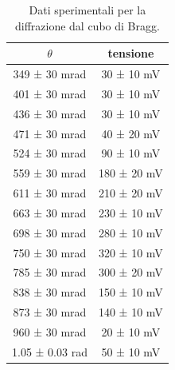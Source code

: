 \documentclass[a4paper]{article}
\begin{document}
\begin{table}[htbp]
\centering
\begin{tabular}{|c|c|}
\hline
$\theta$ & tensione \\\hline\hline
349 ± 30 mrad & 30 ± 10 mV \\
401 ± 30 mrad & 30 ± 10 mV \\
436 ± 30 mrad & 30 ± 10 mV \\
471 ± 30 mrad & 40 ± 20 mV \\
524 ± 30 mrad & 90 ± 10 mV \\
559 ± 30 mrad & 180 ± 20 mV \\
611 ± 30 mrad & 210 ± 20 mV \\
663 ± 30 mrad & 230 ± 10 mV \\
698 ± 30 mrad & 280 ± 10 mV \\
750 ± 30 mrad & 320 ± 10 mV \\
785 ± 30 mrad & 300 ± 20 mV \\
838 ± 30 mrad & 150 ± 10 mV \\
873 ± 30 mrad & 140 ± 10 mV \\
960 ± 30 mrad & 20 ± 10 mV \\
1.05 ± 0.03 rad & 50 ± 10 mV \\
\hline
\end{tabular}
\caption{Dati sperimentali per la diffrazione dal cubo di Bragg.}
\label{tab:dati_bragg}
\end{table}
\end{document}
